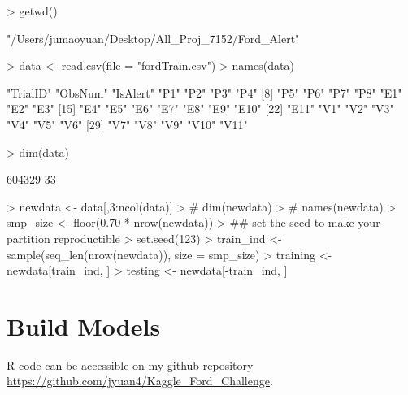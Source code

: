 \documentclass[11pt]{article}
\begin{document}
\begin{Schunk}
\begin{Sinput}
> getwd()
\end{Sinput}
\begin{Soutput}
[1] "/Users/jumaoyuan/Desktop/All_Proj_7152/Ford_Alert"
\end{Soutput}
\begin{Sinput}
> data <- read.csv(file = "fordTrain.csv")
> names(data)
\end{Sinput}
\begin{Soutput}
 [1] "TrialID" "ObsNum"  "IsAlert" "P1"      "P2"      "P3"      "P4"     
 [8] "P5"      "P6"      "P7"      "P8"      "E1"      "E2"      "E3"     
[15] "E4"      "E5"      "E6"      "E7"      "E8"      "E9"      "E10"    
[22] "E11"     "V1"      "V2"      "V3"      "V4"      "V5"      "V6"     
[29] "V7"      "V8"      "V9"      "V10"     "V11"    
\end{Soutput}
\begin{Sinput}
> dim(data)
\end{Sinput}
\begin{Soutput}
[1] 604329     33
\end{Soutput}
\begin{Sinput}
> newdata <- data[,3:ncol(data)]
> # dim(newdata)
> # names(newdata)
> smp_size <- floor(0.70 * nrow(newdata))
> ## set the seed to make your partition reproductible
> set.seed(123)
> train_ind <- sample(seq_len(nrow(newdata)), size = smp_size)
> training <- newdata[train_ind, ]
> testing <- newdata[-train_ind, ]
\end{Sinput}
\end{Schunk}

\section{Build Models}
R code can be accessible on my github repository \url{https://github.com/jyuan4/Kaggle_Ford_Challenge}.

\end{document}
